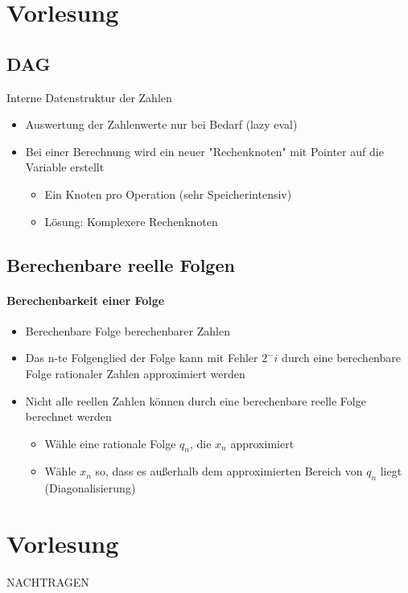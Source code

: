 \documentclass[ngerman]{scrartcl}
\begin{document}
\section{Vorlesung}

\subsection{DAG}
Interne Datenstruktur der Zahlen
\begin{itemize}
  \item Auswertung der Zahlenwerte nur bei Bedarf (lazy eval)
  \item Bei einer Berechnung wird ein neuer "Rechenknoten" mit Pointer auf die Variable erstellt
  \begin{itemize}
    \item Ein Knoten pro Operation (sehr Speicherintensiv)
    \item Lösung: Komplexere Rechenknoten
  \end{itemize}
\end{itemize}

\subsection{Berechenbare reelle Folgen}
\paragraph{Berechenbarkeit einer Folge} 
\begin{itemize}
  \item Berechenbare Folge berechenbarer Zahlen
  \item Das n-te Folgenglied der Folge kann mit Fehler $ 2^-i $ durch eine berechenbare Folge rationaler Zahlen approximiert werden
  \item Nicht alle reellen Zahlen können durch eine berechenbare reelle Folge berechnet werden
  \begin{itemize}
    \item Wähle eine rationale Folge $ q_n $, die $ x_n $ approximiert
    \item Wähle $ x_n $ so, dass es außerhalb dem approximierten Bereich von $ q_n $ liegt (Diagonalisierung)
  \end{itemize}
\end{itemize}

\section{Vorlesung}
NACHTRAGEN
\end{document}
